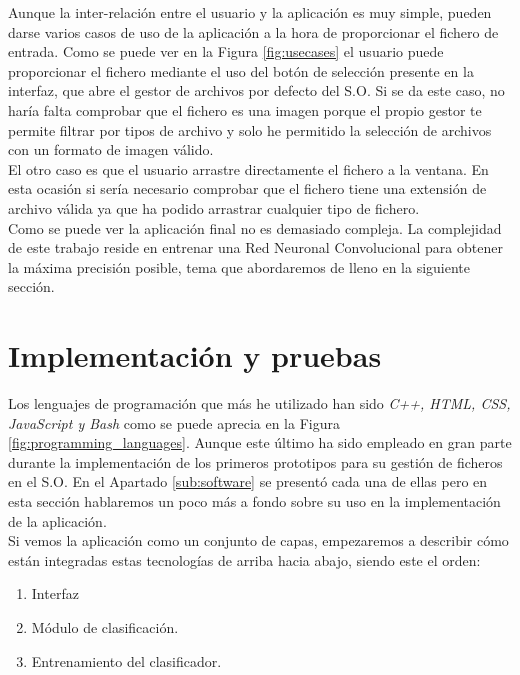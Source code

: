 \documentclass[a4paper,11pt]{book}
\begin{document}
Aunque la inter-relación entre el usuario y la aplicación es muy simple, pueden darse varios casos de uso de la aplicación a la hora de proporcionar el fichero de entrada. Como se puede ver en la Figura \ref{fig:usecases} el usuario puede proporcionar el fichero mediante el uso del botón de selección presente en la interfaz, que abre el gestor de archivos por defecto del S.O. Si se da este caso, no haría falta comprobar que el fichero es una imagen porque el propio gestor te permite filtrar por tipos de archivo y solo he permitido la selección de archivos con un formato de imagen válido.\\
El otro caso es que el usuario arrastre directamente el fichero a la ventana. En esta ocasión si sería necesario comprobar que el fichero tiene una extensión de archivo válida ya que ha podido arrastrar cualquier tipo de fichero.\\
Como se puede ver la aplicación final no es demasiado compleja. La complejidad de este trabajo reside en entrenar una Red Neuronal Convolucional para obtener la máxima precisión posible, tema que abordaremos de lleno en la siguiente sección.



\section{Implementación y pruebas}

Los lenguajes de programación que más he utilizado han sido \textit{C++, HTML, CSS, JavaScript y Bash} como se puede aprecia en la Figura \ref{fig:programming_languages}. Aunque este último ha sido empleado en gran parte durante la implementación de los primeros prototipos para su gestión de ficheros en el S.O. En el Apartado \ref{sub:software} se presentó cada una de ellas pero en esta sección hablaremos un poco más a fondo sobre su uso en la implementación de la aplicación.\\
Si vemos la aplicación como un conjunto de capas, empezaremos a describir cómo están integradas estas tecnologías de arriba hacia abajo, siendo este el orden:
\begin{enumerate}
	\item Interfaz
	\item Módulo de clasificación.
	\item Entrenamiento del clasificador.
\end{enumerate}
\end{document}
